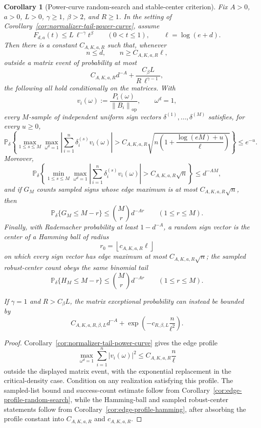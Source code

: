 \documentclass[11pt]{amsart}
\numberwithin{equation}{section}
\newtheorem{corollary}[theorem]{Corollary}
\theoremstyle{definition}
\theoremstyle{remark}
\newcommand{\op}{\mathrm{op}}
\newcommand{\Prob}{\mathbb P}
\newcommand{\norm}[1]{\left\lVert #1\right\rVert}
\begin{document}
\begin{corollary}[Power-curve random-search and stable-center criterion]
\label{cor:normalizer-tail-power-search}
Fix \(A>0\), \(a>0\), \(L>0\), \(\gamma\ge1\), \(\beta>2\), and \(R\ge1\).
In the setting of Corollary~\ref{cor:normalizer-tail-power-curve}, assume
\[
  F_{d,a}(t)\le L\,\ell^{-\gamma}t^\beta
  \qquad(0<t\le1),
  \qquad \ell=\log(e+d).
\]
Then there is a constant \(C_{A,K,a,R}\) such that, whenever
\[
  n\le d,\qquad n\ge C_{A,K,a,R}\ell ,
\]
outside a matrix event of probability at most
\[
  C_{A,K,a,R}d^{-A}
  +\frac{C_\beta L}{R\,\ell^{\gamma-1}},
\]
the following all hold conditionally on the matrices.  With
\[
  v_i(\omega):=\frac{P_i(\omega)}{\norm{B_i}_{\op}},
  \qquad \omega^d=1,
\]
every \(M\)-sample of independent uniform sign vectors
\(\delta^{(1)},\ldots,\delta^{(M)}\) satisfies, for every \(u\ge0\),
\[
  \Prob_\delta\left\{
  \max_{1\le s\le M}\max_{\omega^d=1}
  \left|\sum_{i=1}^n\delta_i^{(s)}v_i(\omega)\right|
  >
  C_{A,K,a,R}\sqrt{
    n\left(1+\frac{\log(eM)+u}{\ell}\right)}
  \right\}
  \le e^{-u}.
\]
Moreover,
\[
  \Prob_\delta\left\{
  \min_{1\le s\le M}\max_{\omega^d=1}
  \left|\sum_{i=1}^n\delta_i^{(s)}v_i(\omega)\right|
  > C_{A,K,a,R}\sqrt n
  \right\}\le d^{-AM},
\]
and if \(G_M\) counts sampled signs whose edge maximum is at most
\(C_{A,K,a,R}\sqrt n\), then
\[
  \Prob_\delta\{G_M\le M-r\}\le \binom Mr d^{-Ar}
  \qquad(1\le r\le M).
\]
Finally, with Rademacher probability at least \(1-d^{-A}\), a random sign vector
is the center of a Hamming ball of radius
\[
  r_0=\left\lfloor c_{A,K,a,R}\ell\right\rfloor
\]
on which every sign vector has edge maximum at most \(C_{A,K,a,R}\sqrt n\);
the sampled robust-center count obeys the same binomial tail
\[
  \Prob_\delta\{H_M\le M-r\}\le \binom Mr d^{-Ar}
  \qquad(1\le r\le M).
\]

If \(\gamma=1\) and \(R>C_\beta L\), the matrix exceptional probability can
instead be bounded by
\[
  C_{A,K,a,R,\beta,L}d^{-A}
  +\exp\left(-c_{R,\beta,L}\frac n{\ell^2}\right).
\]
\end{corollary}

\begin{proof}
Corollary~\ref{cor:normalizer-tail-power-curve} gives the edge profile
\[
  \max_{\omega^d=1}\sum_{i=1}^n |v_i(\omega)|^2
  \le C_{A,K,a,R}\frac n\ell
\]
outside the displayed matrix event, with the exponential replacement in the
critical-density case.  Condition on any realization satisfying this profile.
The sampled-list bound and success-count estimate follow from
Corollary~\ref{cor:edge-profile-random-search}, while the Hamming-ball and
sampled robust-center statements follow from
Corollary~\ref{cor:edge-profile-hamming}, after absorbing the profile constant
into \(C_{A,K,a,R}\) and \(c_{A,K,a,R}\).
\end{proof}
\end{document}
